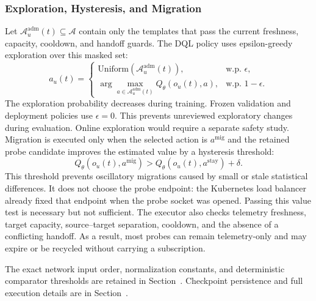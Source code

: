 \begin{algorithm}[!htbp]
\small
\caption{Probe-Guided Selection and Guarded Execution}
\label{alg:compact-control}
\end{algorithm}
\subsubsection{Exploration, Hysteresis, and Migration}

Let $\mathcal{A}^{\mathrm{adm}}_u(t)\subseteq\mathcal{A}$ contain only the templates
that pass the current freshness, capacity, cooldown, and handoff guards. The
DQL policy uses epsilon-greedy exploration over this masked set:
\begin{equation}
	a_u(t)=
	\begin{cases}
		\text{Uniform}(\mathcal{A}^{\mathrm{adm}}_u(t)), & \text{w.p. } \epsilon,\\
		\arg\max_{a\in\mathcal{A}^{\mathrm{adm}}_u(t)} Q_\theta(o_u(t),a), & \text{w.p. } 1-\epsilon.
	\end{cases}
\end{equation}
The exploration probability decreases during training. Frozen validation and
deployment policies use $\epsilon=0$. This prevents unreviewed exploratory
changes during evaluation. Online exploration would require a separate
safety study. Migration is
executed only when the selected action is $a^{\mathrm{mig}}$ and the retained probe
candidate improves the estimated value by a hysteresis threshold:
\begin{equation}
	Q_\theta(o_u(t),a^{\mathrm{mig}}) >
	Q_\theta(o_u(t),a^{\mathrm{stay}})+\delta.
\end{equation}
This threshold prevents oscillatory migrations caused by small or stale
statistical differences. It does not choose the probe endpoint: the Kubernetes
load balancer already fixed that endpoint when the probe socket was opened.
Passing this value test is necessary but not sufficient. The executor also
checks telemetry freshness, target capacity, source--target separation, cooldown,
and the absence of a conflicting handoff. As a result, most probes
can remain telemetry-only and may expire or be recycled without carrying a
subscription.

The exact network input order, normalization constants, and deterministic
comparator thresholds are retained in Section~. Checkpoint persistence and full execution
details are in Section~.
